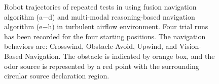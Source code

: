 \begin{figure}[h!]
\begin{center}
\end{center}
\vspace{-.1in}

\caption
{Robot trajectories of repeated tests in using fusion navigation algorithm (a$-$d) and multi-modal reasoning-based navigation algorithm (e$-$h) in turbulent airflow environment. Four trial runs has been recorded for the four starting positions. The navigation behaviors are: Crosswind, Obstacle-Avoid, Upwind, and Vision-Based Navigation. The obstacle is indicated by orange box, and the odor source is represented by a red point with the surrounding circular source declaration region.}
\label{fig:LLMe1TrajectoriesTurbulent}
\end{figure}



